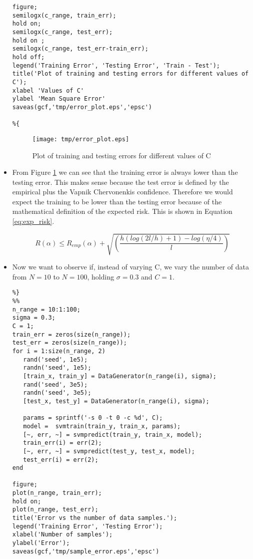 \documentclass[11pt, twoside]{article}   	%
\begin{document}
\begin{itemize}
\begin{lstlisting}
figure; 
semilogx(c_range, train_err);
hold on; 
semilogx(c_range, test_err); 
hold on ;
semilogx(c_range, test_err-train_err); 
hold off; 
legend('Training Error', 'Testing Error', 'Train - Test'); 
title('Plot of training and testing errors for different values of C'); 
xlabel 'Values of C'
ylabel 'Mean Square Error'
saveas(gcf,'tmp/error_plot.eps','epsc')

%{
\end{lstlisting}

\begin{figure}[h]
\centering
\texttt{[image: tmp/error\_plot.eps]}
\caption{Plot of training and testing errors for different values of C}
\label{fig:c_errors} 
\end{figure}

\item From Figure \ref{fig:c_errors} we can see that the training error is
always lower than the testing error. This makes sense because the test error
is defined by the empirical plus the Vapnik Chervonenkis confidence. Therefore we
would expect the training to be lower than the testing error because of the mathematical 
definition of the expected risk. This is shown in Equation \ref{eq:exp_risk}. 

\begin{equation}
R(\alpha) \leq R_{emp}(\alpha) + \sqrt{(\frac{h(log(2l/h)+1) -log(\eta/4)}{l})}
\label{eq:exp_risk}
\end{equation}

\item Now we want to observe if, instead of varying C, we vary the number
of data from $N=10$ to $N=100$, holding $\sigma = 0.3$ and $C=1$.

\begin{lstlisting}
%}
%%
n_range = 10:1:100; 
sigma = 0.3; 
C = 1; 
train_err = zeros(size(n_range)); 
test_err = zeros(size(n_range)); 
for i = 1:size(n_range, 2)
   rand('seed', 1e5);
   randn('seed', 1e5);
   [train_x, train_y] = DataGenerator(n_range(i), sigma);
   rand('seed', 3e5);
   randn('seed', 3e5);
   [test_x, test_y] = DataGenerator(n_range(i), sigma);
   
   params = sprintf('-s 0 -t 0 -c %d', C); 
   model =  svmtrain(train_y, train_x, params);
   [~, err, ~] = svmpredict(train_y, train_x, model); 
   train_err(i) = err(2); 
   [~, err, ~] = svmpredict(test_y, test_x, model);
   test_err(i) = err(2); 
end

figure; 
plot(n_range, train_err); 
hold on; 
plot(n_range, test_err); 
title('Error vs the number of data samples.'); 
legend('Training Error', 'Testing Error'); 
xlabel('Number of samples'); 
ylabel('Error'); 
saveas(gcf,'tmp/sample_error.eps','epsc')



\end{lstlisting}
\end{itemize}
\end{document}
